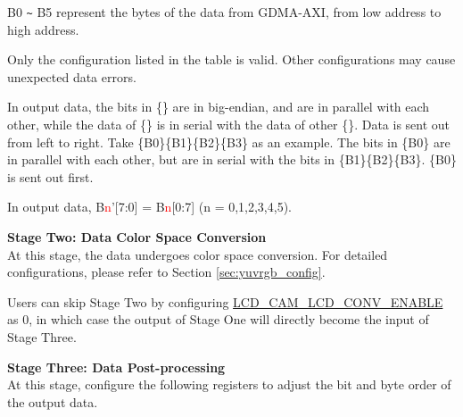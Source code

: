 \documentclass[main\_\_EN.tex]{subfiles}
\begin{document}
\begin{table}[H]
\begin{threeparttable}
\begin{tablenotes}
        \item[1] B0 \verb+~+ B5 represent the bytes of the data from GDMA-AXI, from low address to high address.
        \item[2] Only the configuration listed in the table is valid. Other configurations may cause unexpected data errors.
        \item[3] In output data, the bits in \{\} are in big-endian, and are in parallel with each other, while the data of \{\} is in serial with the data of other \{\}. Data is sent out from left to right. Take \{B0\}\{B1\}\{B2\}\{B3\} as an example. The bits in \{B0\} are in parallel with each other, but are in serial with the bits in \{B1\}\{B2\}\{B3\}. \{B0\} is sent out first.
        \item[4] In output data, B{\textcolor{red}{n}}'[7:0] = B{\textcolor{red}{n}}[0:7] (n = 0,1,2,3,4,5).
    \end{tablenotes}
    \end{threeparttable}
\end{table}

\textbf{Stage Two: Data Color Space Conversion}\\
At this stage, the data undergoes color space conversion. For detailed configurations, please refer to Section \ref{sec:yuvrgb_config}.

\begin{tiplisting}
Users can skip Stage Two by configuring \hyperref[fielddesc:LCDCAMLCDCONVENABLE]{LCD\_CAM\_LCD\_CONV\_ENABLE} as 0, in which case the output of Stage One will directly become the input of Stage Three.
\end{tiplisting}

\textbf{Stage Three: Data Post-processing}\\
At this stage, configure the following registers to adjust the bit and byte order of the output data.
\end{document}
